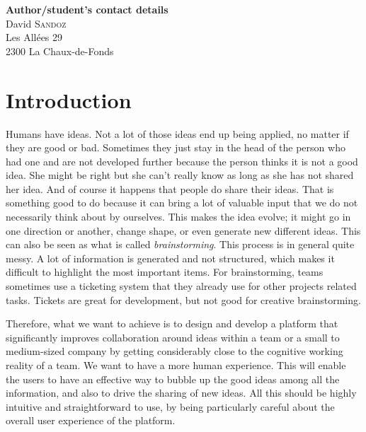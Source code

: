 \documentclass[a4paper,12pt, oneside]{article}
\newenvironment{acknowledgments}
  {\renewcommand{\abstractname}{Acknowledgments}
   \begin{abstract}}
  {\end{abstract}}
\begin{document}



\vspace*{5cm}
\begin{acknowledgments}
    \lipsum[1] %
\end{acknowledgments}
\vfill
\textbf{Author/student's contact details}\\
David \textsc{Sandoz}\\
Les Allées 29\\
2300 La Chaux-de-Fonds\\

\noindent
{}
\newpage

\vspace*{5cm}
\begin{abstract}
    \lipsum[1] %
\end{abstract}
\newpage

\tableofcontents
\newpage

\setcounter{page}{1}


\section{Introduction}
Humans have ideas. Not a lot of those ideas end up being applied, no matter if they are good or bad.
Sometimes they just stay in the head of the person who had one and are not developed further because the person thinks it is not a good idea.
She might be right but she can't really know as long as she has not shared her idea.
And of course it happens that people do share their ideas.
That is something good to do because it can bring a lot of valuable input that we do not necessarily think about by ourselves.
This makes the idea evolve; it might go in one direction or another, change shape, or even generate new different ideas.
This can also be seen as what is called \emph{brainstorming}. This process is in general quite messy.
A lot of information is generated and not structured, which makes it difficult to highlight the most important items.
For brainstorming, teams sometimes use a ticketing system that they already use for other projects related tasks.
Tickets are great for development, but not good for creative brainstorming.

Therefore, what we want to achieve is to design and develop a platform that significantly improves collaboration around ideas within a team or a small to medium-sized company by getting considerably close to the cognitive working reality of a team.
We want to have a more human experience.
This will enable the users to have an effective way to bubble up the good ideas among all the information, and also to drive the sharing of new ideas.
All this should be highly intuitive and straightforward to use, by being particularly careful about the overall user experience of the platform.
\end{document}
